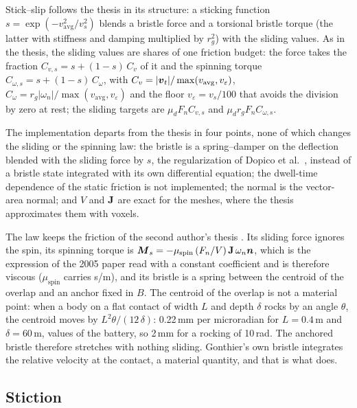 Stick--slip follows the thesis \cite{Gonthier2007thesis} in its structure: a sticking function
$s = \exp(-v_\mathrm{avg}^2/v_s^2)$ blends a bristle force and a torsional bristle torque (the
latter with stiffness and damping multiplied by $r_g^2$) with the sliding values. As in the
thesis, the sliding values are shares of one friction budget: the force takes the fraction
$C_{v,s} = s + (1-s)\,C_v$ of it and the spinning torque $C_{\omega,s} = s + (1-s)\,C_\omega$,
with $C_v = |\boldsymbol{v}_t|/\max(v_\mathrm{avg}, v_\varepsilon)$,
$C_\omega = r_g|\omega_n|/\max(v_\mathrm{avg}, v_\varepsilon)$ and the floor
$v_\varepsilon = v_s/100$ that avoids the division by zero at rest; the sliding targets are
$\mu_d F_n C_{v,s}$ and $\mu_d r_g F_n C_{\omega,s}$.

The implementation departs from the thesis in four points, none of which changes the sliding or
the spinning law: the bristle is a spring--damper on the deflection blended with the sliding
force by $s$, the regularization of Dopico et al.~\cite{Dopico2011}, instead of a bristle state
integrated with its own differential equation; the dwell-time dependence of the static friction
is not implemented; the normal is the vector-area normal; and $V$ and $\mathbf{J}$ are exact for
the meshes, where the thesis approximates them with voxels.

The law  keeps the friction of the second author's thesis
\cite{Vilela2018}. Its sliding force ignores the spin, its spinning torque is
$\boldsymbol{M}_s = -\mu_\mathrm{spin}\,(F_n/V)\,\mathbf{J}\,\omega_n\boldsymbol{n}$, which is the expression of
the 2005 paper \cite{Gonthier2005} read with a constant coefficient and is therefore viscous
($\mu_\mathrm{spin}$ carries s/m), and its bristle is a spring between the centroid of the
overlap and an anchor fixed in $B$. The centroid of the overlap is not a material point: when a
body on a flat contact of width $L$ and depth $\delta$ rocks by an angle $\theta$, the centroid
moves by $L^2\theta/(12\,\delta)$: 0.22\,mm per microradian for $L = 0.4$\,m and
$\delta = 60$\,\textmu m, values of the battery, so 2\,mm for a rocking of 10\,\textmu rad. The
anchored bristle therefore stretches with nothing sliding. Gonthier's own bristle integrates
the relative velocity at the contact, a material quantity, and that is what 
does.

\subsection{Stiction}

